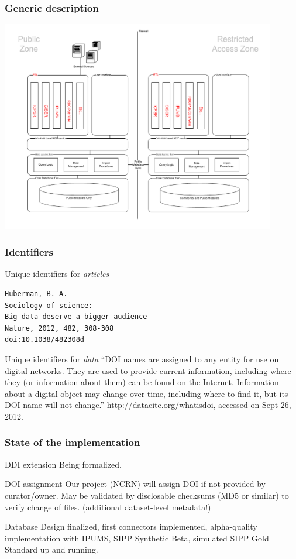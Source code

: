 \begin{frame}
\frametitle{Generic description}
\centering
\includegraphics[width=0.9\textwidth]{"CCBMR"}
\end{frame}

\begin{frame}[fragile]
\frametitle{Identifiers}
\begin{block}{Unique identifiers for {\it articles}}
\begin{verbatim}
Huberman, B. A.
Sociology of science:
Big data deserve a bigger audience
Nature, 2012, 482, 308-308
doi:10.1038/482308d
\end{verbatim}
\end{block}
\begin{block}{Unique identifiers for {\it data}}
``DOI names are assigned to any entity for use on digital networks. 
They are used to provide current information, including where they (or information about them) can be found on the Internet.
Information about a digital object may change over time, including where to find it, but its DOI name will not change.''
\tiny http://datacite.org/whatisdoi, accessed on Sept 26, 2012.
\end{block}

\end{frame}

\begin{frame}
\frametitle{State of the implementation}
\begin{block}{DDI extension}
Being formalized.
\end{block}
\begin{block}{DOI assignment}
Our project (NCRN) will assign DOI if not provided by curator/owner. May be validated by disclosable checksums (MD5 or similar) to verify change of files. (additional dataset-level metadata!)
\end{block}
\begin{block}{Database}
Design finalized, first connectors implemented, alpha-quality implementation with IPUMS, SIPP Synthetic Beta, simulated SIPP Gold Standard up and running.
\end{block}
\end{frame}

